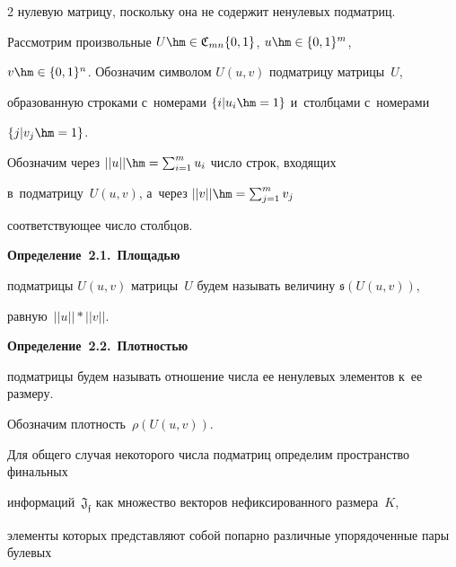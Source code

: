 \begin{multicols}{2}
нулевую матрицу, поскольку она не содержит ненулевых подматриц.





Рассмотрим произвольные $U \hm\in \mathfrak{C}_{mn}\{0,1\}$,  $u\hm \in \{0,1\}^m$, 


$v\hm \in \{0,1\}^n$. Обозначим символом $U(u,v)$ подматрицу матрицы~$U$, 


образованную строками с~номерами $\{i|u_i\hm=1\}$ и~столбцами с~номерами 


$\{j|v_j\hm=1\}$.





Обозначим через $||u|| \hm=\sum\nolimits_{i=1}^m u_i$ число строк, входящих 


в~подматрицу~$U(u,v)$, а~через   $||v||\hm=\sum\nolimits_{j=1}^m v_j$ 


соответствующее чис\-ло столбцов.





\smallskip





\noindent


\textbf{Определение~2.1.}\ \textbf{Площадью} 


подматрицы $U(u,v)$ мат\-ри\-цы~$U$ будем называть величину $\mathfrak{s}(U(u,v))$, 


равную~$||u||*||v||$.





\smallskip





\noindent


\textbf{Определение~2.2.}\ \textbf{Плотностью}


подматрицы будем называть отношение числа ее ненулевых элементов к~ее размеру. 


Обозначим плот\-ность~$\rho(U(u,v))$.





\smallskip





Для общего случая некоторого числа под\-мат\-риц определим пространство финальных 


информаций~$\mathfrak{J_f}$ как множество векторов нефиксированного размера~$K$, 


элементы которых представляют собой попарно различные упорядоченные пары булевых 



\end{multicols}
